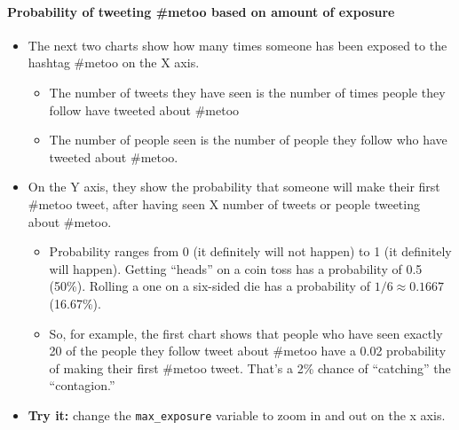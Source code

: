 \documentclass[11pt]{article}
\providecommand{\tightlist}{%
      \setlength{\itemsep}{0pt}\setlength{\parskip}{0pt}}
\begin{document}
\hypertarget{probability-of-tweeting-metoo-based-on-amount-of-exposure}{%
\paragraph{Probability of tweeting \#metoo based on amount of
exposure}\label{probability-of-tweeting-metoo-based-on-amount-of-exposure}}

\begin{itemize}
\tightlist
\item
  The next two charts show how many times someone has been exposed to
  the hashtag \#metoo on the X axis.

  \begin{itemize}
  \tightlist
  \item
    The number of tweets they have seen is the number of times people
    they follow have tweeted about \#metoo
  \item
    The number of people seen is the number of people they follow who
    have tweeted about \#metoo.
  \end{itemize}
\item
  On the Y axis, they show the probability that someone will make their
  first \#metoo tweet, after having seen X number of tweets or people
  tweeting about \#metoo.

  \begin{itemize}
  \tightlist
  \item
    Probability ranges from 0 (it definitely will not happen) to 1 (it
    definitely will happen). Getting ``heads'' on a coin toss has a
    probability of 0.5 (50\%). Rolling a one on a six-sided die has a
    probability of \(1/6 \approx 0.1667\) (16.67\%).
  \item
    So, for example, the first chart shows that people who have seen
    exactly 20 of the people they follow tweet about \#metoo have a 0.02
    probability of making their first \#metoo tweet. That's a 2\% chance
    of ``catching'' the ``contagion.''
  \end{itemize}
\item
  \textbf{Try it:} change the \texttt{max\_exposure} variable to zoom in
  and out on the x axis.
\end{itemize}
\end{document}
